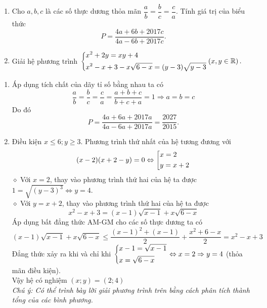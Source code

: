 \begin{ex}%
\hfill
    \begin{enumerate}    
        \item Cho $a,b,c$ là các số thực dương thỏa mãn $\dfrac{a}{b}=\dfrac{b}{c}=\dfrac{c}{a}$. Tính giá trị của biểu thức
        $$P=\dfrac{4a+6b+2017c}{4a-6b+2017c}.$$
        \item Giải hệ phương trình $\left\{\begin{aligned}&x^2+2y=xy+4\\&x^2-x+3-x\sqrt{6-x}=(y-3)\sqrt{y-3}\end{aligned}\right. \left(x,y\in \Bbb R\right).$
    \end{enumerate}
\loigiai
    {
    \begin{enumerate}
        \item Áp dụng tích chất của dãy tỉ số bằng nhau ta có
        $$\dfrac{a}{b}=\dfrac{b}{c}=\dfrac{c}{a}=\dfrac{a+b+c}{b+c+a}=1\Rightarrow a=b=c$$
        Do đó
        $$P=\dfrac{4a+6a+2017a}{4a-6a+2017a}=\dfrac{2027}{2015}.$$
        \item Điều kiện $x\le 6; y\ge 3$. Phương trình thứ nhất của hệ tương đương với\\
        $$(x-2)(x+2-y)=0\Leftrightarrow \left[\begin{aligned}&x=2\\&y=x+2\end{aligned}\right.$$
        $\diamond$ Với $x=2$, thay vào phương trình thứ hai của hệ ta được $1=\sqrt{(y-3)^3}\Leftrightarrow y=4$.\\
        $\diamond$ Với $y=x+2$, thay vào phương trình thứ hai của hệ ta được 
        $$x^2-x+3=(x-1)\sqrt{x-1}+x\sqrt{6-x}$$
        Áp dụng bất đẳng thức AM-GM cho các số thực dương ta có
        $$(x-1)\sqrt{x-1}+x\sqrt{6-x}\leq \dfrac{(x-1)^2+(x-1)}{2}+\dfrac{x^2+6-x}{2}=x^2-x+3$$
        Đẳng thức xảy ra khi và chỉ khi $\left\{\begin{aligned}&x-1=\sqrt{x-1}\\&x=\sqrt{6-x}\end{aligned}\right. \Leftrightarrow x=2\Rightarrow y=4$ (thỏa mãn điều kiện).\\
        Vậy hệ có nghiệm $(x;y)=(2;4)$\\
        \textit{Chú ý: Có thể trình bày lời giải phương trình trên bằng cách phân tích thành tổng của các bình phương.}
     \end{enumerate}
    }
\end{ex}


